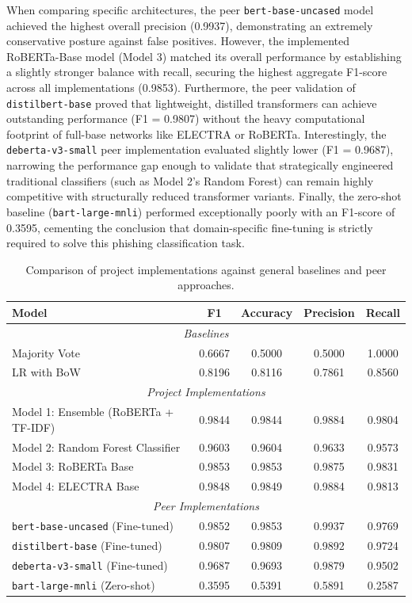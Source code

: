 \documentclass[11pt]{article}
\begin{document}
When comparing specific architectures, the peer \texttt{bert-base-uncased} model achieved the highest overall precision (0.9937), demonstrating an extremely conservative posture against false positives. However, the implemented RoBERTa-Base model (Model 3) matched its overall performance by establishing a slightly stronger balance with recall, securing the highest aggregate F1-score across all implementations (0.9853). Furthermore, the peer validation of \texttt{distilbert-base} proved that lightweight, distilled transformers can achieve outstanding performance (F1 = 0.9807) without the heavy computational footprint of full-base networks like ELECTRA or RoBERTa. Interestingly, the \texttt{deberta-v3-small} peer implementation evaluated slightly lower (F1 = 0.9687), narrowing the performance gap enough to validate that strategically engineered traditional classifiers (such as Model 2's Random Forest) can remain highly competitive with structurally reduced transformer variants. Finally, the zero-shot baseline (\texttt{bart-large-mnli}) performed exceptionally poorly with an F1-score of 0.3595, cementing the conclusion that domain-specific fine-tuning is strictly required to solve this phishing classification task.

\begin{table}[h]
\centering
\small
\begin{tabular}{l c c c c}
\hline
\textbf{Model} & \textbf{F1} & \textbf{Accuracy} & \textbf{Precision} & \textbf{Recall} \\
\hline
\multicolumn{5}{c}{\textit{Baselines}} \\
\hline
Majority Vote                      & 0.6667 & 0.5000 & 0.5000 & 1.0000 \\
LR with BoW                        & 0.8196 & 0.8116 & 0.7861 & 0.8560 \\
\hline
\multicolumn{5}{c}{\textit{Project Implementations}} \\
\hline
Model 1: Ensemble (RoBERTa + TF-IDF) & 0.9844 & 0.9844 & 0.9884 & 0.9804 \\
Model 2: Random Forest Classifier       & 0.9603 & 0.9604 & 0.9633 & 0.9573 \\
Model 3: RoBERTa Base              & 0.9853 & 0.9853 & 0.9875 & 0.9831 \\
Model 4: ELECTRA Base              & 0.9848 & 0.9849 & 0.9884 & 0.9813 \\
\hline
\multicolumn{5}{c}{\textit{Peer Implementations}} \\
\hline
\texttt{bert-base-uncased} (Fine-tuned)       & 0.9852 & 0.9853 & 0.9937 & 0.9769 \\
\texttt{distilbert-base} (Fine-tuned)         & 0.9807 & 0.9809 & 0.9892 & 0.9724 \\
\texttt{deberta-v3-small} (Fine-tuned)        & 0.9687 & 0.9693 & 0.9879 & 0.9502 \\
\texttt{bart-large-mnli} (Zero-shot)          & 0.3595 & 0.5391 & 0.5891 & 0.2587 \\
\hline
\end{tabular}
\caption{Comparison of project implementations against general baselines and peer approaches.}
\label{tab:results-comparison}
\end{table}
\end{document}
